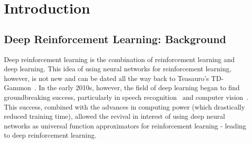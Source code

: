 
\chapter{Introduction}
\vspace{2em}

\section{Deep Reinforcement Learning: Background}

Deep reinforcement learning is the combination of reinforcement learning and deep learning. This idea of using neural networks for reinforcement learning, however, is not new and can be dated all the way back to Teasauro's TD-Gammon~\cite{tesauro_temporal_nodate}. In the early 2010s, however, the field of deep learning began to find groundbreaking success, particularly in speech recognition~\cite{dahl_context-dependent_2012} and computer vision~\cite{krizhevsky_imagenet_2017}. This success, combined with the advances in computing power (which drastically reduced training time), allowed the revival in interest of using deep neural networks as universal function approximators for reinforcement learning - leading to deep reinforcement learning.
